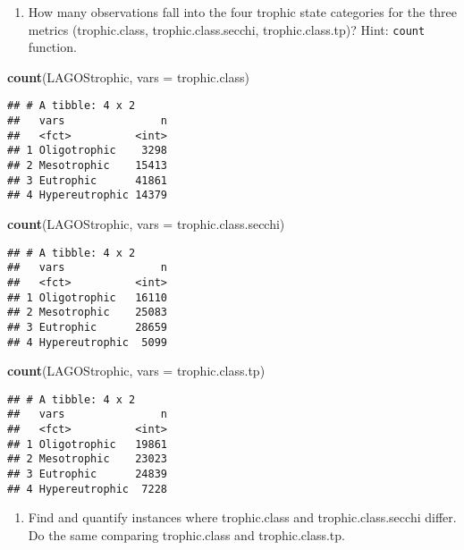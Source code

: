 \documentclass[]{article}
\newenvironment{Shaded}{\begin{snugshade}}{\end{snugshade}}
\newcommand{\DataTypeTok}[1]{\textcolor[rgb]{0.13,0.29,0.53}{#1}}
\newcommand{\KeywordTok}[1]{\textcolor[rgb]{0.13,0.29,0.53}{\textbf{#1}}}
\newcommand{\NormalTok}[1]{#1}
\providecommand{\tightlist}{%
  \setlength{\itemsep}{0pt}\setlength{\parskip}{0pt}}
\begin{document}
\begin{enumerate}
\def\labelenumi{\arabic{enumi}.}
\setcounter{enumi}{5}
\tightlist
\item
  How many observations fall into the four trophic state categories for
  the three metrics (trophic.class, trophic.class.secchi,
  trophic.class.tp)? Hint: \texttt{count} function.
\end{enumerate}

\begin{Shaded}
\begin{Highlighting}[]
\KeywordTok{count}\NormalTok{(LAGOStrophic, }\DataTypeTok{vars =}\NormalTok{ trophic.class)}
\end{Highlighting}
\end{Shaded}

\begin{verbatim}
## # A tibble: 4 x 2
##   vars               n
##   <fct>          <int>
## 1 Oligotrophic    3298
## 2 Mesotrophic    15413
## 3 Eutrophic      41861
## 4 Hypereutrophic 14379
\end{verbatim}

\begin{Shaded}
\begin{Highlighting}[]
\KeywordTok{count}\NormalTok{(LAGOStrophic, }\DataTypeTok{vars =}\NormalTok{ trophic.class.secchi)}
\end{Highlighting}
\end{Shaded}

\begin{verbatim}
## # A tibble: 4 x 2
##   vars               n
##   <fct>          <int>
## 1 Oligotrophic   16110
## 2 Mesotrophic    25083
## 3 Eutrophic      28659
## 4 Hypereutrophic  5099
\end{verbatim}

\begin{Shaded}
\begin{Highlighting}[]
\KeywordTok{count}\NormalTok{(LAGOStrophic, }\DataTypeTok{vars =}\NormalTok{ trophic.class.tp)}
\end{Highlighting}
\end{Shaded}

\begin{verbatim}
## # A tibble: 4 x 2
##   vars               n
##   <fct>          <int>
## 1 Oligotrophic   19861
## 2 Mesotrophic    23023
## 3 Eutrophic      24839
## 4 Hypereutrophic  7228
\end{verbatim}

\begin{enumerate}
\def\labelenumi{\arabic{enumi}.}
\setcounter{enumi}{6}
\tightlist
\item
  Find and quantify instances where trophic.class and
  trophic.class.secchi differ. Do the same comparing trophic.class and
  trophic.class.tp.
\end{enumerate}
\end{document}
